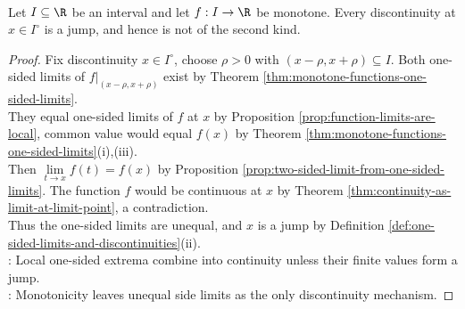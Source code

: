 \begin{corollary} \label{cor:monotone-no-second-kind-discontinuities} \\
Let $I\subseteq\R$ be an interval and let $f:I\to\R$ be monotone. Every discontinuity at $x\in I^\circ$ is a jump, and hence is not of the second kind.
\begin{proof}
Fix discontinuity $x\in I^\circ$, choose $\rho>0$ with $(x-\rho,x+\rho)\subseteq I$. Both one-sided limits of $f|_{(x-\rho,x+\rho)}$ exist by Theorem \ref{thm:monotone-functions-one-sided-limits}.\\
They equal one-sided limits of $f$ at $x$ by Proposition \ref{prop:function-limits-are-local}, common value would equal $f(x)$ by Theorem \ref{thm:monotone-functions-one-sided-limits}(i),(iii).\\
Then $\lim\limits_{t\to x}f(t)=f(x)$ by Proposition \ref{prop:two-sided-limit-from-one-sided-limits}. The function $f$ would be continuous at $x$ by Theorem \ref{thm:continuity-as-limit-at-limit-point}, a contradiction.\\
Thus the one-sided limits are unequal, and $x$ is a jump by Definition \ref{def:one-sided-limits-and-discontinuities}(ii).\\
: Local one-sided extrema combine into continuity unless their finite values form a jump.\\
: Monotonicity leaves unequal side limits as the only discontinuity mechanism.
\end{proof}
\end{corollary}

